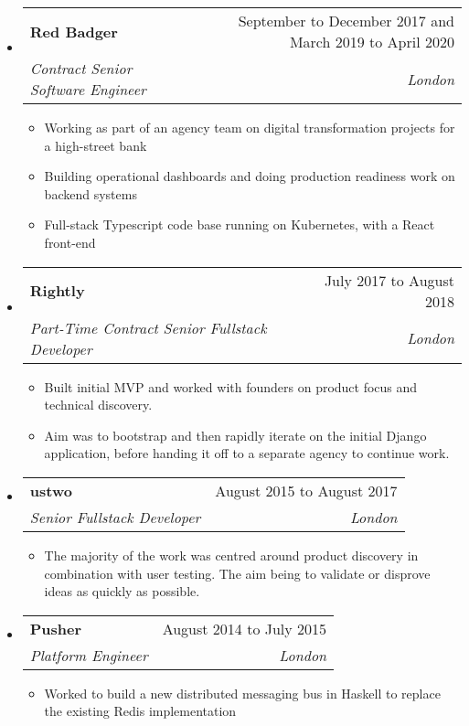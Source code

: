 \documentclass[letterpaper,12pt]{article}[leftmargin=*]
\makeatletter
\def \entryspacing {-0pt}
\newenvironment{resumeEntry}[0]{
  \begin{itemize}[leftmargin=2.5mm]
  }{
  \end{itemize}\vspace{\entryspacing}
}
\newenvironment{resumeItemList}[0]{
  \begin{itemize}[leftmargin=4.5mm]
  }{
  \end{itemize}
}
\newcommand{\resumeItem}[1]{
  \item\small{
    {#1 \vspace{-2pt}}
  }
}
\newcommand{\resumeEntryTSDL}[4]{
  \vspace{-1pt}\item[]
    \begin{tabularx}{0.97\textwidth}{X@{\hspace{60pt}}r}
      \textbf{\color{primary}#1} & {\firabook\color{accent}\small#2} \\
      \textit{\color{accent}\small#3} & \textit{\color{accent}\small#4} \\
    \end{tabularx}\vspace{-6pt}
}
\makeatother
\begin{document}
  \begin{resumeEntry}
    \resumeEntryTSDL{Red Badger}{September to December 2017 and March 2019 to April 2020}
      {Contract Senior Software Engineer}{London}
    \begin{resumeItemList}
      \resumeItem{Working as part of an agency team on digital transformation projects for a high-street bank}
      \resumeItem{Building operational dashboards and doing production readiness work on backend systems}
      \resumeItem{Full-stack Typescript code base running on Kubernetes, with a React front-end}
    \end{resumeItemList}
  \end{resumeEntry}


  \begin{resumeEntry}
    \resumeEntryTSDL{Rightly}{July 2017 to August 2018}{Part-Time Contract Senior Fullstack Developer}{London}
    \begin{resumeItemList}
      \resumeItem{Built initial MVP and worked with founders on product focus and technical discovery.}
      \resumeItem{Aim was to bootstrap and then rapidly iterate on the initial Django application, before handing it off to a separate agency to continue work.}
    \end{resumeItemList}
  \end{resumeEntry}

  \begin{resumeEntry}
    \resumeEntryTSDL{ustwo}{August 2015 to August 2017}{Senior Fullstack Developer}{London}
    \begin{resumeItemList}
      \resumeItem{The majority of the work was centred around product discovery in combination with user testing. The aim being to validate or disprove ideas as quickly as possible.}
    \end{resumeItemList}
  \end{resumeEntry}

  \begin{resumeEntry}
    \resumeEntryTSDL{Pusher}{August 2014 to July 2015}
      {Platform Engineer}{London}
    \begin{resumeItemList}
      \resumeItem{Worked to build a new distributed messaging bus in Haskell to replace the existing Redis implementation}
    \end{resumeItemList}
  \end{resumeEntry}
\end{document}
